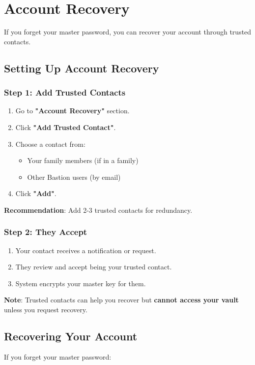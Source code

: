 \documentclass[11pt,a4paper]{article}
\begin{document}
\section{Account Recovery}
If you forget your master password, you can recover your account through trusted contacts.

\subsection{Setting Up Account Recovery}

\subsubsection{Step 1: Add Trusted Contacts}
\begin{enumerate}
    \item Go to \textbf{"Account Recovery"} section.
    \item Click \textbf{"Add Trusted Contact"}.
    \item Choose a contact from:
    \begin{itemize}
        \item Your family members (if in a family)
        \item Other Bastion users (by email)
    \end{itemize}
    \item Click \textbf{"Add"}.
\end{enumerate}
\textbf{Recommendation}: Add 2-3 trusted contacts for redundancy.

\subsubsection{Step 2: They Accept}
\begin{enumerate}
    \item Your contact receives a notification or request.
    \item They review and accept being your trusted contact.
    \item System encrypts your master key for them.
\end{enumerate}
\textbf{Note}: Trusted contacts can help you recover but \textbf{cannot access your vault} unless you request recovery.

\subsection{Recovering Your Account}
If you forget your master password:
\end{document}
